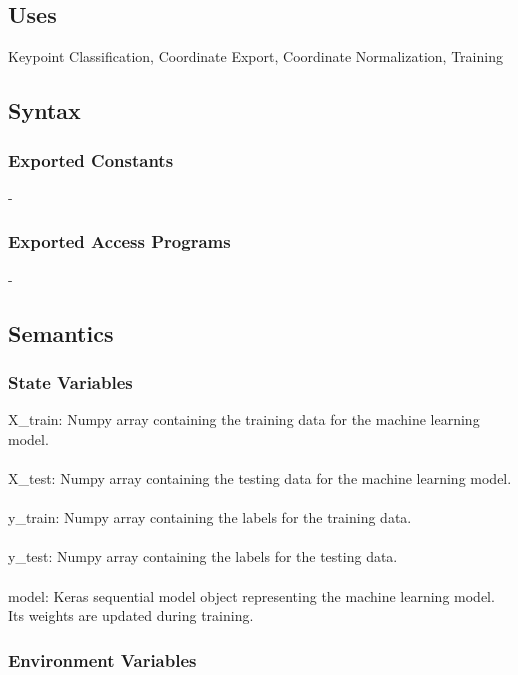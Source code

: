 \documentclass[12pt, titlepage]{article}
\begin{document}
\subsection{Uses}

Keypoint Classification, Coordinate Export, Coordinate Normalization, Training\\

\subsection{Syntax}

\subsubsection{Exported Constants}
-

\subsubsection{Exported Access Programs}
-

\subsection{Semantics}

\subsubsection{State Variables}

X\_train: Numpy array containing the training data for the machine learning model.\\
\\
X\_test: Numpy array containing the testing data for the machine learning model.\\
\\
y\_train: Numpy array containing the labels for the training data.\\
\\
y\_test: Numpy array containing the labels for the testing data.\\
\\
model: Keras sequential model object representing the machine learning model. Its weights are updated during training.\\

\subsubsection{Environment Variables}
\end{document}

